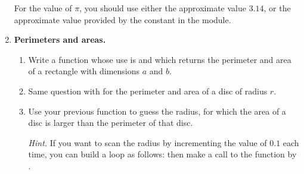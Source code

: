 \documentclass[11pt,class=report,crop=false]{standalone}
\begin{document}
\begin{activite}
\begin{enumerate}
   For the value of $\pi$, you should use either the approximate value $3.14$, or the approximate value provided by the constant  in the  module.
  
  
  \item \textbf{Perimeters and areas.}
  
  \begin{enumerate}
    \item Write a function whose use is  and which returns the perimeter and area of a rectangle with dimensions $a$ and $b$.
      
    \item Same question with  for the perimeter and area of a  disc of radius $r$.
    
    \item Use your previous function to guess the radius, for which the area of a disc is larger than the perimeter of that disc.
    
    \emph{Hint.} If you want to scan the radius by incrementing the value of $0.1$ each time, you can build a loop as follows:   
    then make a call to the function by .
  \end{enumerate}
\end{enumerate}
  

\end{activite}




\end{document}
